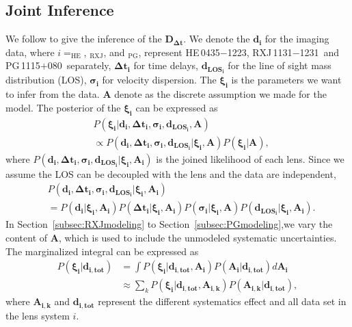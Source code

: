 \documentclass[useAMS,usenatbib]{mnras}
\newcommand\rxj{RXJ\,1131$-$1231}
\newcommand\he{HE\,0435$-$1223}
\newcommand\pg{PG\,1115$+$080}
\newcommand{\sref}[1]{Section~\ref{#1}}
\def\dt{D_{\Delta t}}
\begin{document}
\subsection{Joint Inference}
\label{sec:Jointinfer}
We follow \citet{WongEtal17} to give the inference of the $\bm{\dt}$. We denote the $\bm{d_{i}}$ for the imaging data, where $i= _{\textrm{HE}}$, $_{\textrm{RXJ}}$, and $_{\textrm{PG}}$, represent \he, \rxj\, and \pg\ separately, $\bm{\Delta t_{i}}$ for time delays, $\bm{d_{\textrm{LOS}_{i}}}$ for the line of sight mass distribution (LOS), $\bm{\sigma_{i}}$ for velocity dispersion. The $\bm{\xi_{i}}$ is the parameters we want to infer from the data. $\bm{A}$ denote as the discrete assumption we made for the model.
The posterior of the $\bm{\xi_{i}}$ can be expressed as
\begin{equation}
\begin{split}
&P(\bm{\xi_{i}}|\bm{d_{i}},\bm{\Delta t_{i}},\bm{\sigma_{i}}, \bm{d_{\textrm{LOS}_{i}}}, \bm{A}) \\
&\propto P(\bm{d_{i}},\bm{\Delta t_{i}},\bm{\sigma_{i}}, \bm{d_{\textrm{LOS}_{i}}}|\bm{\xi_{i}},\bm{A})P(\bm{\xi_{i}}|\bm{A}), 
\end{split}
\end{equation}
where $P(\bm{d_{i}},\bm{\Delta t_{i}},\bm{\sigma_{i}}, \bm{d_{\textrm{LOS}_{i}}}|\bm{\xi_{i}},\bm{A_{i}})$ is the joined likelihood of each lens. Since we assume the LOS can be decoupled with the lens and the data are independent, 
\begin{equation}
\begin{split}
&P(\bm{d_{i}},\bm{\Delta t_{i}},\bm{\sigma_{i}}, \bm{d_{\textrm{LOS}_{i}}}|\bm{\xi_{i}},\bm{A_{i}}) \\
&=P(\bm{d_{i}}|\bm{\xi_{i}},\bm{A_{i}})P(\bm{\Delta t_{i}}|\bm{\xi_{i}},\bm{A_{i}})P(\bm{\sigma_{i}}|\bm{\xi_{i}},\bm{A})P(\bm{d_{\textrm{LOS}_{i}}}|\bm{\xi_{i}},\bm{A_{i}}).
\end{split}
\end{equation}
In \sref{subsec:RXJmodeling} to \sref{subsec:PGmodeling},we vary the content of $\bm{A}$, which is used to include the unmodeled systematic uncertainties. The marginalized integral can be expressed as
\begin{equation}
\begin{split}
P(\bm{\xi_{i}}|\bm{d_{i,tot}})&=\int P(\bm{\xi_{i}}|\bm{d_{i,\textrm{tot}}},\bm{A_{i}})P(\bm{A_{i}}|\bm{d_{i,\textrm{tot}}})d\bm{A_{i}} \\
&\approx \sum_{k}P(\bm{\xi_{i}}|\bm{d_{i,\textrm{tot}}},\bm{A_{i,k}})P(\bm{A_{i,k}}|\bm{d_{i,\textrm{tot}}}),
\end{split}
\end{equation}
where $\bm{A_{i,k}}$ and $\bm{d_{i,\textrm{tot}}}$ represent the different systematics effect and all data set in the lens system $i$.
\end{document}

